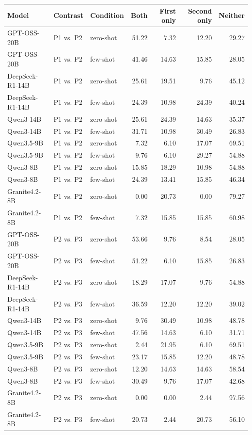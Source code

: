 \begin{tabularx}{\textwidth}{llXrrrr}
\toprule
Model & Contrast & Condition & Both & First only & Second only & Neither \\
\midrule
GPT-OSS-20B & P1 vs. P2 & zero-shot & 51.22 & 7.32 & 12.20 & 29.27 \\
GPT-OSS-20B & P1 vs. P2 & few-shot & 41.46 & 14.63 & 15.85 & 28.05 \\
DeepSeek-R1-14B & P1 vs. P2 & zero-shot & 25.61 & 19.51 & 9.76 & 45.12 \\
DeepSeek-R1-14B & P1 vs. P2 & few-shot & 24.39 & 10.98 & 24.39 & 40.24 \\
Qwen3-14B & P1 vs. P2 & zero-shot & 25.61 & 24.39 & 14.63 & 35.37 \\
Qwen3-14B & P1 vs. P2 & few-shot & 31.71 & 10.98 & 30.49 & 26.83 \\
Qwen3.5-9B & P1 vs. P2 & zero-shot & 7.32 & 6.10 & 17.07 & 69.51 \\
Qwen3.5-9B & P1 vs. P2 & few-shot & 9.76 & 6.10 & 29.27 & 54.88 \\
Qwen3-8B & P1 vs. P2 & zero-shot & 15.85 & 18.29 & 10.98 & 54.88 \\
Qwen3-8B & P1 vs. P2 & few-shot & 24.39 & 13.41 & 15.85 & 46.34 \\
Granite4.2-8B & P1 vs. P2 & zero-shot & 0.00 & 20.73 & 0.00 & 79.27 \\
Granite4.2-8B & P1 vs. P2 & few-shot & 7.32 & 15.85 & 15.85 & 60.98 \\
GPT-OSS-20B & P2 vs. P3 & zero-shot & 53.66 & 9.76 & 8.54 & 28.05 \\
GPT-OSS-20B & P2 vs. P3 & few-shot & 51.22 & 6.10 & 15.85 & 26.83 \\
DeepSeek-R1-14B & P2 vs. P3 & zero-shot & 18.29 & 17.07 & 9.76 & 54.88 \\
DeepSeek-R1-14B & P2 vs. P3 & few-shot & 36.59 & 12.20 & 12.20 & 39.02 \\
Qwen3-14B & P2 vs. P3 & zero-shot & 9.76 & 30.49 & 10.98 & 48.78 \\
Qwen3-14B & P2 vs. P3 & few-shot & 47.56 & 14.63 & 6.10 & 31.71 \\
Qwen3.5-9B & P2 vs. P3 & zero-shot & 2.44 & 21.95 & 6.10 & 69.51 \\
Qwen3.5-9B & P2 vs. P3 & few-shot & 23.17 & 15.85 & 12.20 & 48.78 \\
Qwen3-8B & P2 vs. P3 & zero-shot & 12.20 & 14.63 & 14.63 & 58.54 \\
Qwen3-8B & P2 vs. P3 & few-shot & 30.49 & 9.76 & 17.07 & 42.68 \\
Granite4.2-8B & P2 vs. P3 & zero-shot & 0.00 & 0.00 & 2.44 & 97.56 \\
Granite4.2-8B & P2 vs. P3 & few-shot & 20.73 & 2.44 & 20.73 & 56.10 \\
\bottomrule
\end{tabularx}
